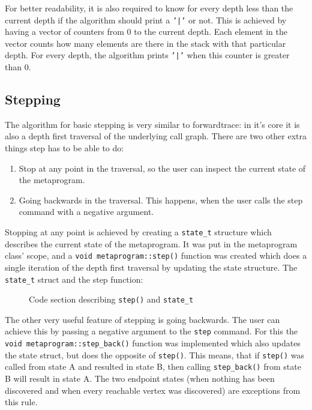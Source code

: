 For better readability, it is also required to know for every depth less than
the current depth if the algorithm should print a \texttt{'|'} or not. This
is achieved by having a vector of counters from 0 to the current depth. Each
element in the vector counts how many elements are there in the stack with that
particular depth. For every depth, the algorithm prints \texttt{'|'} when
this counter is greater than 0.

\subsection{Stepping}

The algorithm for basic stepping is very similar to forwardtrace: in it's core
it is also a depth first traversal of the underlying call graph. There are two
other extra things step has to be able to do:

\begin{enumerate}
    \item
        Stop at any point in the traversal, so the user can inspect the current
        state of the metaprogram.
    \item
        Going backwards in the traversal. This happens, when the user calls the
        step command with a negative argument.
\end{enumerate}

Stopping at any point is achieved by creating a \texttt{state\_t} structure
which describes the current state of the metaprogram. It was put in the
metaprogram class' scope, and a \texttt{void metaprogram::step()} function
was created which does a single iteration of the depth first traversal by
updating the state structure. The \texttt{state\_t} struct and the step
function:

\begin{figure}[H]
    \caption{Code section describing \texttt{step()} and \texttt{state\_t}}
\end{figure}

\noindent
The other very useful feature of stepping is going backwards. The user can
achieve this by passing a negative argument to the \texttt{step} command. For
this the \texttt{void metaprogram::step\_back()} function was implemented which
also updates the state struct, but does the opposite of \texttt{step()}. This
means, that if \texttt{step()} was called from state A and resulted in state
B, then calling \texttt{step\_back()} from state B will result in state A.
The two endpoint states (when nothing has been discovered and when every
reachable vertex was discovered) are exceptions from this rule.

